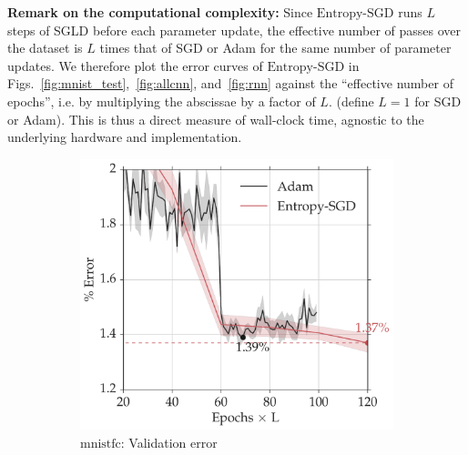 \documentclass[10pt]{article}
\newcommand{\entropysgd}{\mathrm{Entropy}\textrm{-}\mathrm{SGD}}
\newcommand{\mnistfc}{\textrm{mnistfc}}
\begin{document}
\textbf{Remark on the computational complexity:} Since $\entropysgd$ runs $L$ steps of SGLD before each parameter update, the effective number of passes over the dataset is $L$ times that of SGD or Adam for the same number of parameter updates. We therefore plot the error curves of $\entropysgd$ in Figs.~\ref{fig:mnist_test},~\ref{fig:allcnn}, and~\ref{fig:rnn} against the ``effective number of epochs'', i.e. by multiplying the abscissae by a factor of $L$. (define $L = 1$ for SGD or Adam). This is thus a direct measure of wall-clock time, agnostic to the underlying hardware and implementation.

\begin{figure}[htp!]
\centering
    \begin{subfigure}[t]{0.45\textwidth}
        \centering
        \includegraphics[width=1.02\textwidth]{mnistfc_valid.pdf}
        \caption{\small $\mnistfc$: Validation error}
        \label{fig:mnistfc_test}
    \end{subfigure}
    \hspace{0.2in}
    \begin{subfigure}[t]{0.45\textwidth}
        \centering

\end{subfigure}
\end{figure}
\end{document}
